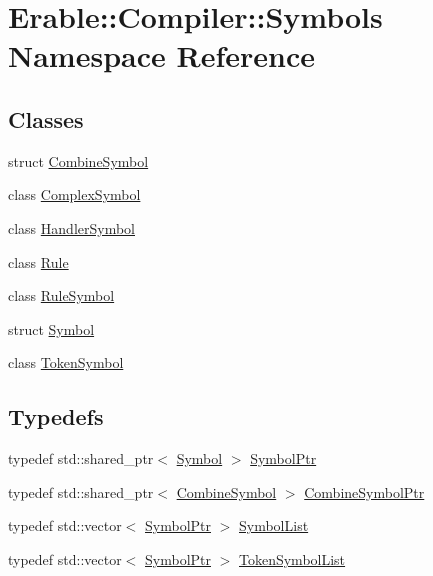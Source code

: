 \hypertarget{namespace_erable_1_1_compiler_1_1_symbols}{}\section{Erable\+::Compiler\+::Symbols Namespace Reference}
\label{namespace_erable_1_1_compiler_1_1_symbols}
\subsection*{Classes}
\begin{DoxyCompactItemize}
\item 
struct \mbox{\hyperlink{struct_erable_1_1_compiler_1_1_symbols_1_1_combine_symbol}{Combine\+Symbol}}
\item 
class \mbox{\hyperlink{class_erable_1_1_compiler_1_1_symbols_1_1_complex_symbol}{Complex\+Symbol}}
\item 
class \mbox{\hyperlink{class_erable_1_1_compiler_1_1_symbols_1_1_handler_symbol}{Handler\+Symbol}}
\item 
class \mbox{\hyperlink{class_erable_1_1_compiler_1_1_symbols_1_1_rule}{Rule}}
\item 
class \mbox{\hyperlink{class_erable_1_1_compiler_1_1_symbols_1_1_rule_symbol}{Rule\+Symbol}}
\item 
struct \mbox{\hyperlink{class_erable_1_1_compiler_1_1_symbols_1_1_symbol}{Symbol}}
\item 
class \mbox{\hyperlink{class_erable_1_1_compiler_1_1_symbols_1_1_token_symbol}{Token\+Symbol}}
\end{DoxyCompactItemize}
\subsection*{Typedefs}
\begin{DoxyCompactItemize}
\item 
typedef std\+::shared\+\_\+ptr$<$ \mbox{\hyperlink{class_erable_1_1_compiler_1_1_symbols_1_1_symbol}{Symbol}} $>$ \mbox{\hyperlink{namespace_erable_1_1_compiler_1_1_symbols_a8f0bc762f448ea4d84e8713ab3e140b9}{Symbol\+Ptr}}
\item 
typedef std\+::shared\+\_\+ptr$<$ \mbox{\hyperlink{struct_erable_1_1_compiler_1_1_symbols_1_1_combine_symbol}{Combine\+Symbol}} $>$ \mbox{\hyperlink{namespace_erable_1_1_compiler_1_1_symbols_ad3326e636860b0452468de51ed673c8a}{Combine\+Symbol\+Ptr}}
\item 
typedef std\+::vector$<$ \mbox{\hyperlink{namespace_erable_1_1_compiler_1_1_symbols_a8f0bc762f448ea4d84e8713ab3e140b9}{Symbol\+Ptr}} $>$ \mbox{\hyperlink{namespace_erable_1_1_compiler_1_1_symbols_a63e8157d2f729d4689d27bacad42f8ed}{Symbol\+List}}
\item 
typedef std\+::vector$<$ \mbox{\hyperlink{namespace_erable_1_1_compiler_1_1_symbols_a8f0bc762f448ea4d84e8713ab3e140b9}{Symbol\+Ptr}} $>$ \mbox{\hyperlink{namespace_erable_1_1_compiler_1_1_symbols_aff1ccebebde106c3c5f3cdca118a1d69}{Token\+Symbol\+List}}
\end{DoxyCompactItemize}
